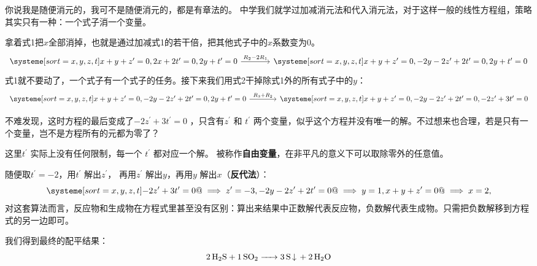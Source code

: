 \documentclass{ctexart}
\begin{document}
你说我是随便消元的，我可不是随便消元的，都是有章法的。
中学我们就学过加减消元法和代入消元法，对于这样一般的线性方程组，策略其实只有一种：一个式子消一个变量。

拿着式1把\(x\)全部消掉，也就是通过加减式1的若干倍，把其他式子中的\(x\)系数变为\(0\)。
\[
    \begin{tikzcd}[column sep=large, row sep=large]
        \systeme[sort={x, y, z, t}]{
            x + y + z^{\prime} = 0,
            2x + 2t^{\prime} = 0,
            2y + t^{\prime} = 0
        }
        \arrow[r, "R_{2} - 2R_{1}"] &
        \systeme[sort={x, y, z, t}]{
            x + y + z^{\prime} = 0,
            -2y - 2z^{\prime} + 2t^{\prime} = 0,
            2y +t^{\prime} = 0
        }
    \end{tikzcd}
\]
式1就不要动了，一个式子有一个式子的任务。接下来我们用式2干掉除式1外的所有式子中的\(y\)：
\[
    \begin{tikzcd}[column sep=large, row sep=large]
        \systeme[sort={x, y, z, t}]{
            x + y + z^{\prime} = 0,
            -2y - 2z^{\prime} + 2t^{\prime} = 0,
            2y +t^{\prime} = 0
        }
        \arrow[r, "R_{3} + R_{2}"] &
        \systeme[sort={x, y, z, t}]{
            x + y + z^{\prime} = 0,
            -2y -2z^{\prime} + 2t^{\prime} = 0,
            -2z^{\prime} + 3t^{\prime} = 0
        }
    \end{tikzcd}
\]

不难发现，这时方程的最后变成了\(- 2z^{\prime} + 3t^{\prime} = 0\) ，只含有\(z^{\prime}\)
和 \(t^{\prime}\) 两个变量，似乎这个方程并没有唯一的解。不过想来也合理，若是只有一个变量，岂不是方程所有的元都为零了？

这里\(t^{\prime} \) 实际上没有任何限制，每一个 \(t^{\prime} \) 都对应一个解。
被称作\textbf{自由变量}，在非平凡的意义下可以取除零外的任意值。

随便取\(t^{\prime} = -2\)，用\(t^{\prime} \) 解出\(z^{\prime} \)，
再用\(z^{\prime} \) 解出\(y\)，再用\(y\) 解出\(x\)（\textbf{反代法}）：
\[
    \systeme[sort={x, y, z, t}]{
        -2z^{\prime} + 3t^{\prime} = 0 @\implies z^{\prime} = -3,
        -2y -2z^{\prime} + 2t^{\prime} = 0 @\implies y = 1,
        x + y + z^{\prime} = 0 @\implies x = 2,
    }
\]
对这套算法而言，反应物和生成物在方程式里甚至没有区别：算出来结果中正数解代表反应物，负数解代表生成物。只需把负数解移到方程式的另一边即可。

我们得到最终的配平结果：
\[
    \ce{2 H2S + 1 SO2 -> 3 S v + 2 H2O}
\]
\end{document}
